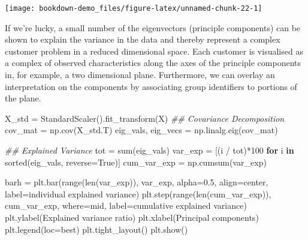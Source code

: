 \documentclass[]{tufte-book}
\newenvironment{Shaded}{}{}
\newcommand{\BuiltInTok}[1]{#1}
\newcommand{\CommentTok}[1]{\textcolor[rgb]{0.38,0.63,0.69}{\textit{#1}}}
\newcommand{\ControlFlowTok}[1]{\textcolor[rgb]{0.00,0.44,0.13}{\textbf{#1}}}
\newcommand{\DecValTok}[1]{\textcolor[rgb]{0.25,0.63,0.44}{#1}}
\newcommand{\FloatTok}[1]{\textcolor[rgb]{0.25,0.63,0.44}{#1}}
\newcommand{\KeywordTok}[1]{\textcolor[rgb]{0.00,0.44,0.13}{\textbf{#1}}}
\newcommand{\NormalTok}[1]{#1}
\newcommand{\OperatorTok}[1]{\textcolor[rgb]{0.40,0.40,0.40}{#1}}
\newcommand{\StringTok}[1]{\textcolor[rgb]{0.25,0.44,0.63}{#1}}
\newcommand{\VariableTok}[1]{\textcolor[rgb]{0.10,0.09,0.49}{#1}}
\theoremstyle{definition}
\theoremstyle{definition}
\theoremstyle{definition}
\theoremstyle{remark}
\begin{document}
\texttt{[image: bookdown-demo\_files/figure-latex/unnamed-chunk-22-1]}

If we're lucky, a small number of the eigenvectors (principle components) can be shown to explain the variance in the data and thereby represent a complex customer problem in a reduced dimensional space. Each customer is visualised as a complex of observed characteristics along the axes of the principle components in, for example, a two dimensional plane. Furthermore, we can overlay an interpretation on the components by associating group identifiers to portions of the plane.

\begin{Shaded}
\begin{Highlighting}[]

\NormalTok{X\_std }\OperatorTok{=}\NormalTok{ StandardScaler().fit\_transform(X)}
\CommentTok{\#\# Covariance Decomposition}
\NormalTok{cov\_mat }\OperatorTok{=}\NormalTok{ np.cov(X\_std.T)}
\NormalTok{eig\_vals, eig\_vecs }\OperatorTok{=}\NormalTok{ np.linalg.eig(cov\_mat)}

\CommentTok{\#\# Explained Variance}
\NormalTok{tot }\OperatorTok{=} \BuiltInTok{sum}\NormalTok{(eig\_vals)}
\NormalTok{var\_exp }\OperatorTok{=}\NormalTok{ [(i }\OperatorTok{/}\NormalTok{ tot)}\OperatorTok{*}\DecValTok{100} \ControlFlowTok{for}\NormalTok{ i }\KeywordTok{in} \BuiltInTok{sorted}\NormalTok{(eig\_vals, reverse}\OperatorTok{=}\VariableTok{True}\NormalTok{)]}
\NormalTok{cum\_var\_exp }\OperatorTok{=}\NormalTok{ np.cumsum(var\_exp)}

\NormalTok{barh }\OperatorTok{=}\NormalTok{ plt.bar(}\BuiltInTok{range}\NormalTok{(}\BuiltInTok{len}\NormalTok{(var\_exp)), var\_exp, alpha}\OperatorTok{=}\FloatTok{0.5}\NormalTok{, align}\OperatorTok{=}\StringTok{\textquotesingle{}center\textquotesingle{}}\NormalTok{,}
\NormalTok{        label}\OperatorTok{=}\StringTok{\textquotesingle{}individual explained variance\textquotesingle{}}\NormalTok{)}
\NormalTok{plt.step(}\BuiltInTok{range}\NormalTok{(}\BuiltInTok{len}\NormalTok{(cum\_var\_exp)), cum\_var\_exp, where}\OperatorTok{=}\StringTok{\textquotesingle{}mid\textquotesingle{}}\NormalTok{,}
\NormalTok{         label}\OperatorTok{=}\StringTok{\textquotesingle{}cumulative explained variance\textquotesingle{}}\NormalTok{)}
\NormalTok{plt.ylabel(}\StringTok{\textquotesingle{}Explained variance ratio\textquotesingle{}}\NormalTok{)}
\NormalTok{plt.xlabel(}\StringTok{\textquotesingle{}Principal components\textquotesingle{}}\NormalTok{)}
\NormalTok{plt.legend(loc}\OperatorTok{=}\StringTok{\textquotesingle{}best\textquotesingle{}}\NormalTok{)}
\NormalTok{plt.tight\_layout()}
\NormalTok{plt.show()}
\end{Highlighting}
\end{Shaded}
\end{document}
